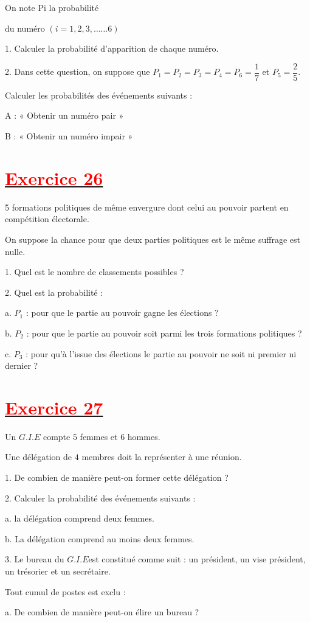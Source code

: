 \documentclass[12pt]{article}
\begin{document}
On note Pi la probabilité

du numéro $\left(i=1, 2, 3, \ldots\ldots 6\right)$

1. Calculer la probabilité d'apparition de chaque numéro.
	
2. Dans cette question, on suppose que $P_{1}=P_{2}=P_{3}=P_{4}=P_{6}=\dfrac{1}{7}$ et $P_{5}=\dfrac{2}{5}.$

Calculer les probabilités des événements suivants :

A : « Obtenir un numéro pair »

B : « Obtenir un numéro impair »
\section*{\underline{\textbf{\textcolor{red}{Exercice 26}}}}
5 formations politiques de même envergure dont celui au pouvoir partent en compétition électorale.

On suppose la chance pour que deux parties politiques est le même suffrage est nulle.

1. Quel est le nombre de classements possibles ?

2. Quel est la probabilité :

a. $ P_{1}$ : pour que le partie au pouvoir gagne les élections ?

b. $P_{2}$ : pour que le partie au pouvoir soit parmi les trois formations politiques ?

c. $P_{3}$ : pour qu'à l'issue des élections le partie au pouvoir ne soit ni premier ni dernier ?
\section*{\underline{\textbf{\textcolor{red}{Exercice 27}}}}
Un $G.I.E$ compte $5$ femmes et $6$ hommes.

Une délégation de $4$ membres doit la représenter à une réunion.

1. De combien de manière peut-on former cette délégation ?

2. Calculer la probabilité des événements suivants :

a. la délégation comprend deux femmes.

b. La délégation comprend au moins deux femmes.

3. Le bureau du $G.I.E $est constitué comme suit : un président, un vise président, un trésorier et un secrétaire.

Tout cumul de postes est exclu :

a. De combien de manière peut-on élire un bureau ?
\end{document}
